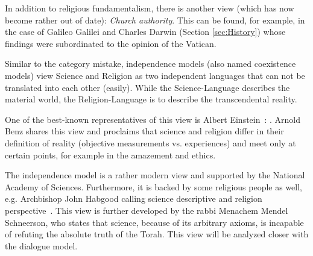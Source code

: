 In addition to religious fundamentalism, there is another view (which has now become rather out of date): \emph{Church authority}.
This can be found, for example, in the case of Galileo Galilei and Charles Darwin (Section \ref{sec:History}) whose findings were subordinated to the opinion of the Vatican.





Similar to the category mistake, independence models (also named coexistence models) view Science and Religion as two independent languages that can not be translated into each other (easily).
While the Science-Language describes the  material world, the Religion-Language is to describe the transcendental reality.

One of the best-known representatives of this view is Albert Einstein~\cite[p.~605\thinspace ff.]{einstein1940science}:
.
Arnold Benz shares this view and proclaims that science and religion
differ in their definition of reality (objective measurements vs. experiences) and meet only at certain points, for example in the amazement and ethics.

The independence model is a rather modern view and supported by the
National Academy of Sciences.
Furthermore, it is backed by some religious people as well, e.g. Archbishop John Habgood calling science descriptive and religion perspective~\cite{habgood1964religion}.
This view is further developed by the rabbi Menachem Mendel Schneerson, who states that science, because of its arbitrary axioms, is incapable of refuting the absolute truth of the Torah. This view will be analyzed closer with the dialogue model.



